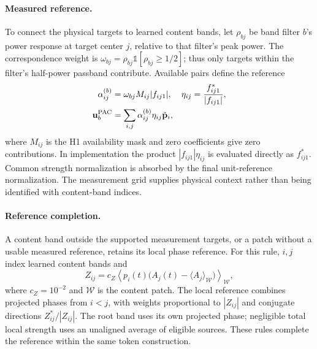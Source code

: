 \documentclass[10pt,twocolumn,letterpaper]{article}
\begin{document}
\paragraph{Measured reference.}
To connect the physical targets to learned content bands, let
$\rho_{bj}$ be band filter $b$'s power response at target center $j$,
relative to that filter's peak power. The correspondence weight is
$\omega_{bj}=\rho_{bj}\mathbb 1[\rho_{bj}\geq 1/2]$; thus only targets
within the filter's half-power passband contribute. Available pairs
define the reference
\begin{equation}
\begin{aligned}
\alpha_{ij}^{(b)}&=\omega_{bj}M_{ij}|f_{ij1}|,
&\eta_{ij}&=\frac{f_{ij1}^{*}}{|f_{ij1}|},\\
\mathbf u_b^{\rm PAC}
 &=\sum_{i,j}\alpha_{ij}^{(b)}\eta_{ij}\tilde{\mathbf p}_i,
\end{aligned}
\label{eq:reference}
\end{equation}
where $M_{ij}$ is the H1 availability mask and zero coefficients give
zero contributions. In implementation the product
$|f_{ij1}|\eta_{ij}$ is evaluated directly as $f_{ij1}^{*}$.
Common strength normalization is absorbed by the final unit-reference
normalization. The measurement grid supplies physical context rather
than being identified with content-band indices.

\paragraph{Reference completion.}
A content band outside the supported measurement targets, or a patch
without a usable measured reference, retains its local phase reference.
For this rule, $i,j$ index learned content bands and
\begin{equation}
Z_{ij}=c_Z\left\langle p_i(t)
 \bigl(A_j(t)-\langle A_j\rangle_{\mathcal W}\bigr)
 \right\rangle_{\mathcal W},
\label{eq:moment}
\end{equation}
where $c_Z=10^{-2}$ and $\mathcal W$ is the content patch. The local
reference combines projected phases from $i<j$, with weights proportional
to $|Z_{ij}|$ and conjugate directions $Z_{ij}^{*}/|Z_{ij}|$.
The root band uses its own projected phase; negligible total local
strength uses an unaligned average of eligible sources. These rules
complete the reference within the same token construction.
\end{document}

